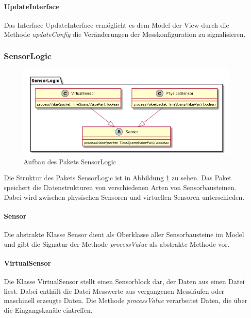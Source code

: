 \documentclass[parskip=full]{scrartcl}
\begin{document}
\paragraph{UpdateInterface}
Das Interface UpdateInterface ermöglicht es dem Model der View durch die Methode \textit{updateConfig} die Veränderungen der Messkonfiguration zu signalisieren.




\subsubsection{SensorLogic}
\begin{figure}[htbp]
	\begin{center}
		\includegraphics[width = 12cm]{Grafiken/SensorLogic.png}
		\caption{Aufbau des Pakets SensorLogic}
		\label{SensorLogic}
	\end{center}
\end{figure}

Die Struktur des Pakets SensorLogic ist in Abbildung \ref{SensorLogic} zu sehen. Das Paket speichert die Datenstrukturen von verschiedenen Arten von Sensorbausteinen. Dabei wird zwischen physischen Sensoren und virtuellen Sensoren unterschieden.



\paragraph{Sensor} Die abstrakte Klasse Sensor dient als Oberklasse aller Sensorbausteine im Model und gibt die Signatur der Methode \textit{processValue} als abstrakte Methode vor.


\paragraph{VirtualSensor}
Die Klasse VirtualSensor stellt einen Sensorblock dar, der Daten aus einen Datei liest. Dabei enthält die Datei Messwerte aus vergangenen Messläufen oder maschinell erzeugte Daten. Die Methode \textit{processValue} verarbeitet Daten, die über die Eingangskanäle eintreffen.
\end{document}

